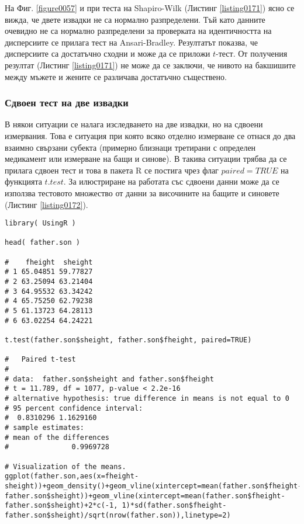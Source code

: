 На Фиг. \ref{figure0057} и при теста на Shapiro-Wilk (Листинг \ref{listing0171}) ясно се вижда, че двете извадки не са нормално разпределени. Тъй като данните очевидно не са нормално разпределени за проверката на идентичността на дисперсиите се прилага тест на Ansari-Bradley. Резултатът показва, че дисперсиите са достатъчно сходни и може да се приложи $t$-тест. От получения резултат (Листинг \ref{listing0171}) не може да се заключи, че нивото на бакшишите между мъжете и жените се различава достатъчно съществено. 

\subsubsection{Сдвоен тест на две извадки}

В някои ситуации се налага изследването на две извадки, но на сдвоени измервания. Това е ситуация при която всяко отделно измерване се отнася до два взаимно свързани субекта (примерно близнаци третирани с определен медикамент или измерване на бащи и синове). В такива ситуации трябва да се прилага сдвоен тест и това в пакета R се постига чрез флаг $paired=TRUE$ на функцията $t.test$. За илюстриране на работата със сдвоени данни може да се използва тестовото множество от данни за височините на бащите и синовете (Листинг \ref{listing0172}).

\begin{lstlisting}[caption=Т-тест на сдвоени данни, label=listing0172]
library( UsingR )

head( father.son )

#    fheight  sheight
# 1 65.04851 59.77827
# 2 63.25094 63.21404
# 3 64.95532 63.34242
# 4 65.75250 62.79238
# 5 61.13723 64.28113
# 6 63.02254 64.24221

t.test(father.son$sheight, father.son$fheight, paired=TRUE)

# 	Paired t-test
# 
# data:  father.son$sheight and father.son$fheight
# t = 11.789, df = 1077, p-value < 2.2e-16
# alternative hypothesis: true difference in means is not equal to 0
# 95 percent confidence interval:
#  0.8310296 1.1629160
# sample estimates:
# mean of the differences 
#               0.9969728 

# Visualization of the means.
ggplot(father.son,aes(x=fheight-sheight))+geom_density()+geom_vline(xintercept=mean(father.son$fheight-father.son$sheight))+geom_vline(xintercept=mean(father.son$fheight-father.son$sheight)+2*c(-1, 1)*sd(father.son$fheight-father.son$sheight)/sqrt(nrow(father.son)),linetype=2)
\end{lstlisting}

